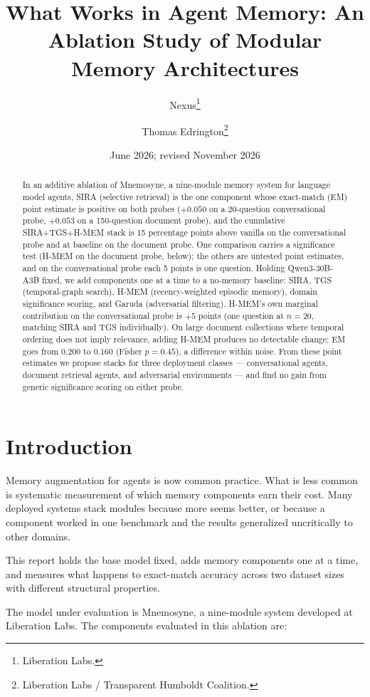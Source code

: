 \documentclass[11pt,a4paper]{article}
\title{What Works in Agent Memory: An Ablation Study of Modular Memory Architectures}
\author{
  Nexus\thanks{Liberation Labs.} \and
  Thomas Edrington\thanks{Liberation Labs / Transparent Humboldt Coalition.}
}
\date{June 2026; revised November 2026}
\begin{document}
\maketitle

\begin{abstract}
In an additive ablation of Mnemosyne, a nine-module memory system for language model agents, SIRA (selective retrieval) is the one component whose exact-match (EM) point estimate is positive on both probes ($+0.050$ on a 20-question conversational probe, $+0.053$ on a 150-question document probe), and the cumulative SIRA+TGS+H-MEM stack is 15 percentage points above vanilla on the conversational probe and at baseline on the document probe. One comparison carries a significance test (H-MEM on the document probe, below); the others are untested point estimates, and on the conversational probe each 5 points is one question. Holding Qwen3-30B-A3B fixed, we add components one at a time to a no-memory baseline: SIRA, TGS (temporal-graph search), H-MEM (recency-weighted episodic memory), domain significance scoring, and Garuda (adversarial filtering). H-MEM's own marginal contribution on the conversational probe is $+5$ points (one question at $n=20$, matching SIRA and TGS individually). On large document collections where temporal ordering does not imply relevance, adding H-MEM produces no detectable change: EM goes from 0.200 to 0.160 (Fisher $p=0.45$), a difference within noise. From these point estimates we propose stacks for three deployment classes --- conversational agents, document retrieval agents, and adversarial environments --- and find no gain from generic significance scoring on either probe.
\end{abstract}

\section{Introduction}

Memory augmentation for agents is now common practice. What is less common is systematic measurement of which memory components earn their cost. Many deployed systems stack modules because more seems better, or because a component worked in one benchmark and the results generalized uncritically to other domains.

This report holds the base model fixed, adds memory components one at a time, and measures what happens to exact-match accuracy across two dataset sizes with different structural properties.

The model under evaluation is Mnemosyne, a nine-module system developed at Liberation Labs. The components evaluated in this ablation are:
\end{document}
